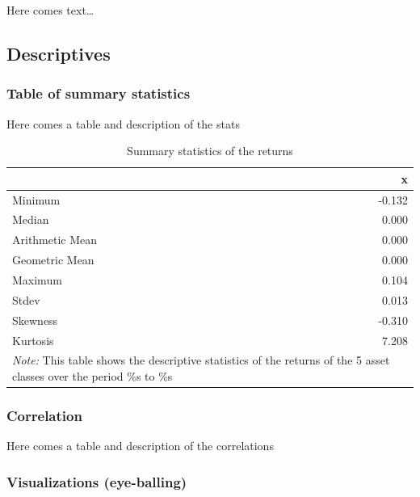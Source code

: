 \documentclass[a4paper, twoside]{templates/ociamthesis}
\begin{document}
Here comes text\ldots{}

\hypertarget{descriptives}{%
\subsection{Descriptives}\label{descriptives}}

\hypertarget{table-of-summary-statistics}{%
\subsubsection{Table of summary statistics}\label{table-of-summary-statistics}}

Here comes a table and description of the stats

\begin{table}[h!]

\caption{\label{tab:dsTable}Summary statistics of the returns}
\centering
\begin{tabular}[t]{lr}
\toprule
  & x\\
\midrule
Minimum & -0.132\\
Median & 0.000\\
Arithmetic Mean & 0.000\\
Geometric Mean & 0.000\\
Maximum & 0.104\\
\addlinespace
Stdev & 0.013\\
Skewness & -0.310\\
Kurtosis & 7.208\\
\bottomrule
\multicolumn{2}{l}{\rule{0pt}{1em}\textit{Note: } This table shows the descriptive statistics of the returns of the 5 asset classes over the period \%s to \%s}\\
\end{tabular}
\end{table}

\hypertarget{correlation}{%
\subsubsection{Correlation}\label{correlation}}

Here comes a table and description of the correlations

\hypertarget{visualizations-eye-balling}{%
\subsubsection{Visualizations (eye-balling)}\label{visualizations-eye-balling}}
\end{document}
